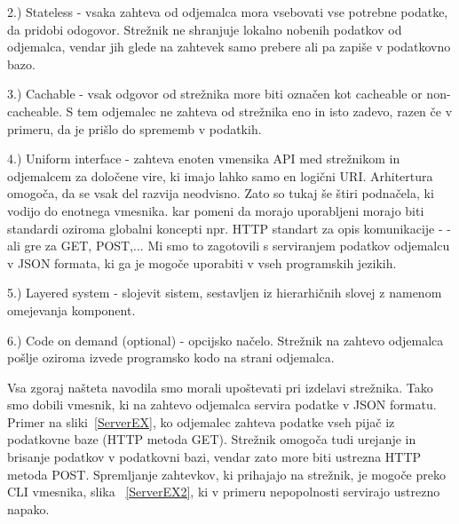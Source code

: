 \documentclass[a4paper, 12pt]{book}
\begin{document}
2.) Stateless - vsaka zahteva od odjemalca mora vsebovati vse potrebne podatke, da pridobi odogovor. Strežnik ne shranjuje lokalno nobenih podatkov od odjemalca, vendar jih glede na zahtevek samo prebere ali pa zapiše v podatkovno bazo.

3.) Cachable - vsak odgovor od strežnika more biti označen kot cacheable or non-cacheable. S tem odjemalec ne zahteva od strežnika eno in isto zadevo, razen če v primeru, da je prišlo do sprememb v podatkih.

4.) Uniform interface - zahteva enoten vmensika API med strežnikom in odjemalcem za določene vire, ki imajo lahko samo en logični URI. Arhitertura omogoča, da se vsak del razvija neodvisno. Zato so tukaj še štiri podnačela, ki vodijo do enotnega vmesnika. kar pomeni da morajo uporabljeni morajo biti standardi oziroma globalni koncepti npr. HTTP standart za opis komunikacije -  - ali gre za GET, POST,...  Mi smo to zagotovili s serviranjem podatkov odjemalcu v JSON formata, ki ga je mogoče uporabiti v vseh programskih jezikih.

5.) Layered system - slojevit sistem, sestavljen iz hierarhičnih slovej z namenom omejevanja komponent.

6.) Code on demand (optional) -  opcijsko načelo. Strežnik na zahtevo odjemalca pošlje oziroma izvede programsko kodo na strani odjemalca.

Vsa zgoraj našteta navodila smo morali upoštevati pri izdelavi strežnika. Tako smo dobili vmesnik, ki na zahtevo odjemalca servira podatke v JSON formatu. Primer na sliki~\ref{ServerEX}, ko odjemalec zahteva podatke vseh pijač iz podatkovne baze (HTTP metoda GET). Strežnik omogoča tudi urejanje in brisanje podatkov v podatkovni bazi, vendar zato more biti ustrezna HTTP metoda POST. Spremljanje zahtevkov, ki prihajajo na strežnik, je mogoče preko CLI vmesnika, slika ~\ref{ServerEX2}, ki v primeru nepopolnosti servirajo ustrezno napako.
\end{document}
